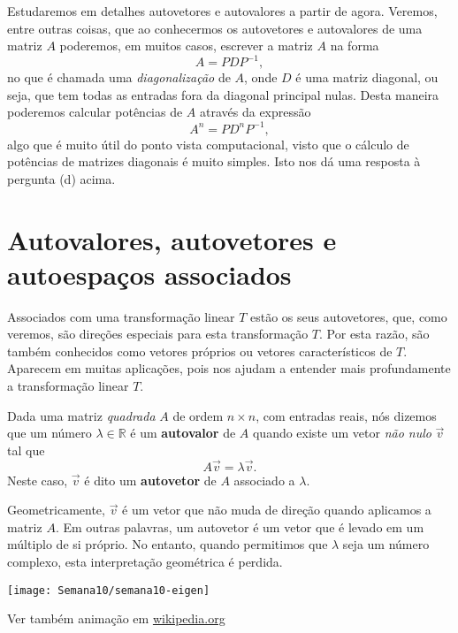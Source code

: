 Estudaremos em detalhes autovetores e autovalores a partir de agora. Veremos, entre outras coisas, que ao conhecermos os autovetores e autovalores de uma matriz $A$
poderemos, em muitos casos, escrever a matriz $A$ na forma
\begin{equation}A = P D P^{-1},\end{equation}
no que é chamada uma {\it diagonalização} de $A$, onde $D$ é uma matriz diagonal, ou seja, que tem todas as entradas fora da diagonal principal nulas. Desta maneira poderemos calcular potências de $A$ através da expressão
\begin{equation}A^n = P D^n P^{-1},\end{equation}
algo que é muito útil do ponto vista computacional, visto que o cálculo de potências de matrizes diagonais é muito simples. Isto nos dá uma resposta à pergunta (d) acima.


\section{Autovalores, autovetores e autoespaços associados}


Associados com uma transformação linear $T$ estão os seus autovetores, que, como veremos, são direções especiais para esta transformação $T$. Por esta razão, são também conhecidos como vetores próprios ou vetores característicos de $T$. Aparecem em muitas aplicações, pois nos ajudam a entender mais profundamente a transformação linear $T$.

Dada uma matriz \textit{quadrada} $A$ de ordem $n \times n$, com entradas reais, nós dizemos que um número $\lambda \in \mathbb{R}$ é um \textbf{autovalor} de $A$ quando existe um vetor \textit{não nulo} $\vec{v}$ tal que
\begin{equation}
A \vec{v} = \lambda \vec{v}.
\end{equation} Neste caso, $\vec{v}$ é dito um \textbf{autovetor} de $A$ associado a $\lambda$.

Geometricamente, $\vec{v}$ é um vetor que não muda de direção quando aplicamos a matriz $A$. Em outras palavras, um autovetor é um vetor que é levado em um múltiplo de si próprio. No entanto, quando permitimos que $\lambda$ seja um número complexo, esta interpretação geométrica é perdida.

		\texttt{[image: Semana10/semana10-eigen]}

\noindent Ver também animação em \href{https://en.wikipedia.org/wiki/Eigenvalues_and_eigenvectors#Matrix_examples}{wikipedia.org}

